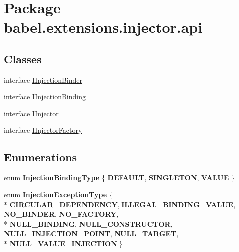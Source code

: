 \hypertarget{namespacebabel_1_1extensions_1_1injector_1_1api}{\section{Package babel.\-extensions.\-injector.\-api}
\label{namespacebabel_1_1extensions_1_1injector_1_1api}
}
\subsection*{Classes}
\begin{DoxyCompactItemize}
\item 
interface \hyperlink{interfacebabel_1_1extensions_1_1injector_1_1api_1_1_i_injection_binder}{I\-Injection\-Binder}
\item 
interface \hyperlink{interfacebabel_1_1extensions_1_1injector_1_1api_1_1_i_injection_binding}{I\-Injection\-Binding}
\item 
interface \hyperlink{interfacebabel_1_1extensions_1_1injector_1_1api_1_1_i_injector}{I\-Injector}
\item 
interface \hyperlink{interfacebabel_1_1extensions_1_1injector_1_1api_1_1_i_injector_factory}{I\-Injector\-Factory}
\end{DoxyCompactItemize}
\subsection*{Enumerations}
\begin{DoxyCompactItemize}
\item 
enum {\bfseries Injection\-Binding\-Type} \{ {\bfseries D\-E\-F\-A\-U\-L\-T}, 
{\bfseries S\-I\-N\-G\-L\-E\-T\-O\-N}, 
{\bfseries V\-A\-L\-U\-E}
 \}
\item 
enum {\bfseries Injection\-Exception\-Type} \{ \\*
{\bfseries C\-I\-R\-C\-U\-L\-A\-R\-\_\-\-D\-E\-P\-E\-N\-D\-E\-N\-C\-Y}, 
{\bfseries I\-L\-L\-E\-G\-A\-L\-\_\-\-B\-I\-N\-D\-I\-N\-G\-\_\-\-V\-A\-L\-U\-E}, 
{\bfseries N\-O\-\_\-\-B\-I\-N\-D\-E\-R}, 
{\bfseries N\-O\-\_\-\-F\-A\-C\-T\-O\-R\-Y}, 
\\*
{\bfseries N\-U\-L\-L\-\_\-\-B\-I\-N\-D\-I\-N\-G}, 
{\bfseries N\-U\-L\-L\-\_\-\-C\-O\-N\-S\-T\-R\-U\-C\-T\-O\-R}, 
{\bfseries N\-U\-L\-L\-\_\-\-I\-N\-J\-E\-C\-T\-I\-O\-N\-\_\-\-P\-O\-I\-N\-T}, 
{\bfseries N\-U\-L\-L\-\_\-\-T\-A\-R\-G\-E\-T}, 
\\*
{\bfseries N\-U\-L\-L\-\_\-\-V\-A\-L\-U\-E\-\_\-\-I\-N\-J\-E\-C\-T\-I\-O\-N}
 \}
\end{DoxyCompactItemize}
